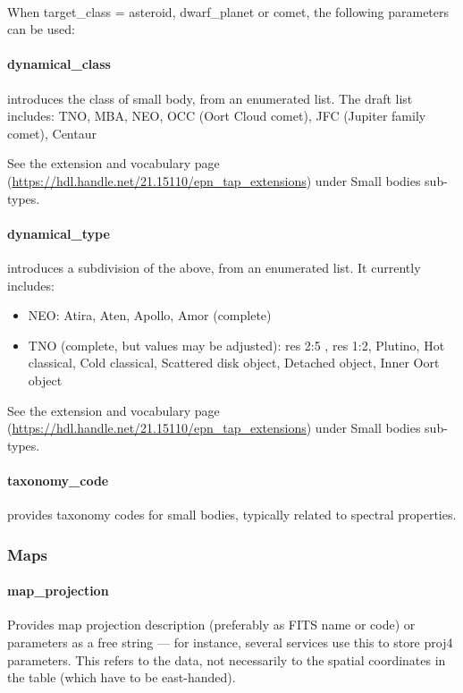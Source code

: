 \documentclass[11pt,a4paper]{ivoa}
\begin{document}
\textbf{\\}When target\_class = asteroid, dwarf\_planet or comet,
the following parameters can be used:

\paragraph{dynamical\_class}

introduces the class of small body, from an enumerated list.
The draft list includes: TNO, MBA, NEO, OCC (Oort Cloud comet),
JFC (Jupiter family comet), Centaur

See the extension and vocabulary page (\url{https://hdl.handle.net/21.15110/epn_tap_extensions}) under Small bodies sub-types.

\paragraph{dynamical\_type}

introduces a subdivision of the above, from an enumerated list.
It currently includes:

\begin{itemize}
\item NEO: Atira, Aten, Apollo, Amor (complete)

\item TNO (complete, but values may be adjusted):
res 2:5 , res 1:2,
Plutino, Hot classical, Cold classical, Scattered disk object,
Detached object, Inner Oort object
\end{itemize}

See the extension and vocabulary page (\url{https://hdl.handle.net/21.15110/epn_tap_extensions}) under Small bodies sub-types.

\paragraph{taxonomy\_code}
provides taxonomy codes for small bodies, typically related to spectral properties.

\subsubsection{Maps}

\paragraph{map\_projection}

Provides map projection description (preferably as FITS name or code)
or parameters as a free string — for instance, several services use
this to store proj4 parameters. This refers to the data, not necessarily
to the spatial coordinates in the table (which have to be east-handed).
\end{document}

